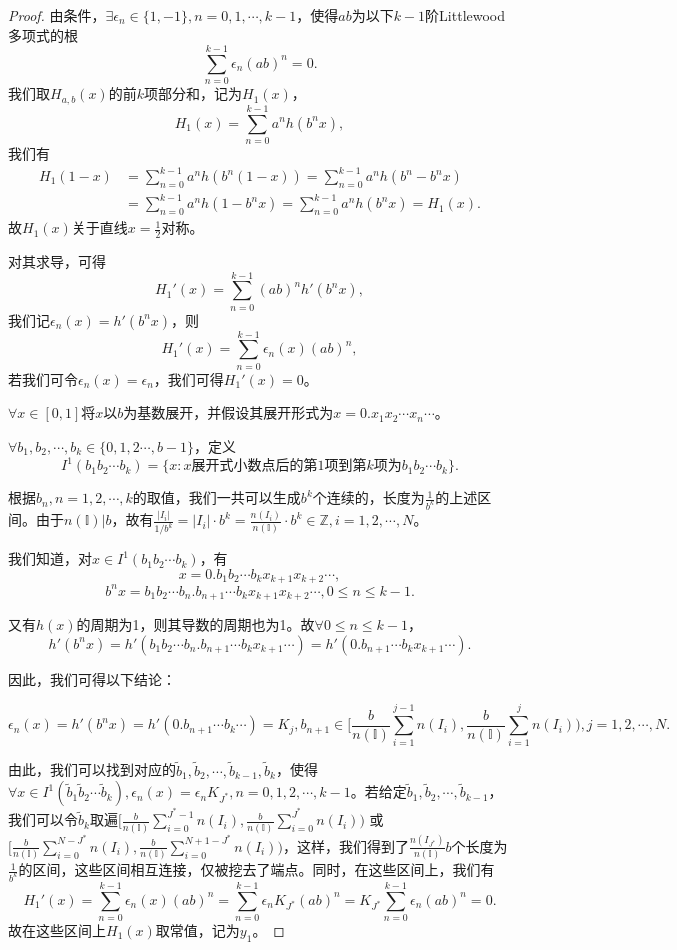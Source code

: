 \begin{proof}
由条件，$\exists \epsilon_n\in\{1,-1\},n=0,1,\cdots,k-1$，使得$ab$为以下$k-1$阶Littlewood多项式的根
$$
      \sum_{n=0}^{k-1}\epsilon_n(ab)^n=0.
$$
我们取$H_{a,b}(x)$的前$k$项部分和，记为$H_1(x)$，
$$
      H_1(x)=\sum_{n=0}^{k-1}a^nh(b^nx),
$$
我们有
$$
    \begin{aligned}
        H_1(1-x)&=\sum_{n=0}^{k-1}a^nh(b^n(1-x))=\sum_{n=0}^{k-1}a^nh(b^n-b^nx)\\
                &=\sum_{n=0}^{k-1}a^nh(1-b^nx)=\sum_{n=0}^{k-1}a^nh(b^nx)=H_1(x).
    \end{aligned}
$$
故$H_1(x)$关于直线$x=\frac{1}{2}$对称。

对其求导，可得
$$
      H_1'(x)=\sum_{n=0}^{k-1}(ab)^nh'(b^nx),
$$
我们记$\epsilon_n(x)=h'(b^nx)$，则
$$
      H_1'(x)=\sum_{n=0}^{k-1}\epsilon_n(x)(ab)^n,
$$
若我们可令$\epsilon_n(x)=\epsilon_n$，我们可得$H_1'(x)=0$。

$\forall x\in[0,1]$将$x$以$b$为基数展开，并假设其展开形式为$x=0.x_1x_2\cdots x_n\cdots$。

$\forall b_1,b_2,\cdots,b_k\in\{0,1,2\cdots,b-1\}$，定义
$$
      I^1(b_1b_2\cdots b_k)=\{x:x\mbox{展开式小数点后的第}1\mbox{项到第}k\mbox{项为}b_1b_2\cdots b_k\}.
$$

根据$b_n,n=1,2,\cdots,k$的取值，我们一共可以生成$b^k$个连续的，长度为$\frac{1}{b^k}$的上述区间。由于$n(\mathbb{I})|b$，故有$\frac{|I_i|}{1/b^k}=|I_i|\cdot b^k=\frac{n(I_i)}{n(\mathbb{I})}\cdot b^k\in\mathbb{Z},i=1,2,\cdots,N$。

我们知道，对$x\in I^1(b_1b_2\cdots b_k)$，有
$$
      x=0.b_1b_2\cdots b_kx_{k+1}x_{k+2}\cdots,
$$
$$
b^{n}x=b_1b_2\cdots b_{n}.b_{n+1}\cdots b_kx_{k+1}x_{k+2}\cdots,0\le n\le k-1.
$$

又有$h(x)$的周期为1，则其导数的周期也为1。故$\forall0\le n\le k-1$，
$$
      h'(b^nx)=h'(b_1b_2\cdots b_n.b_{n+1}\cdots b_kx_{k+1}\cdots)=h'(0.b_{n+1}\cdots b_kx_{k+1}\cdots).
$$

因此，我们可得以下结论：

$$
      \epsilon_n(x)=h'(b^nx)=h'(0.b_{n+1}\cdots b_k\cdots)=            K_j,b_{n+1}\in{\big[}\frac{b}{n(\mathbb{I})}\sum_{i=1}^{j-1}n(I_i),\frac{b}{n(\mathbb{I})}\sum_{i=1}^{j}n(I_i){\big)},j=1,2,\cdots,N.
$$

由此，我们可以找到对应的$\tilde{b}_1,\tilde{b}_2,\cdots,\tilde{b}_{k-1},\tilde{b}_k$，使得$\forall x\in I^1(\tilde{b}_1\tilde{b}_2\cdots \tilde{b}_k),\epsilon_n(x)=\epsilon_nK_{J^*},n=0,1,2,\cdots,k-1$。若给定$\tilde{b}_1,\tilde{b}_2,\cdots,\tilde{b}_{k-1}$，我们可以令$\tilde{b}_k$取遍${\big[}\frac{b}{n(\mathbb{I})}\sum_{i=0}^{J^*-1}n(I_i),\frac{b}{n(\mathbb{I})}\sum_{i=0}^{J^*}n(I_i){\big)}$
或${\big[}\frac{b}{n(\mathbb{I})}\sum_{i=0}^{N-J^*}n(I_i),\frac{b}{n(\mathbb{I})}\sum_{i=0}^{N+1-J^*}n(I_i){\big)}$，这样，我们得到了$\frac{n(I_{J^*})}{n(\mathbb{I})}b$个长度为$\frac{1}{b^k}$的区间，这些区间相互连接，仅被挖去了端点。同时，在这些区间上，我们有
$$
      H_1'(x)=\sum_{n=0}^{k-1}\epsilon_n(x)(ab)^n=\sum_{n=0}^{k-1}\epsilon_nK_{J^*}(ab)^n=K_{J^*}\sum_{n=0}^{k-1}\epsilon_n(ab)^n=0.
$$
故在这些区间上$H_1(x)$取常值，记为$y_1$。


\end{proof}
